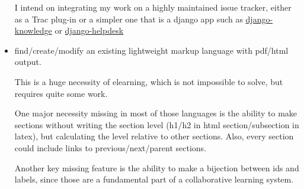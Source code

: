 \documentclass[12pt]{article}
\begin{document}
\begin{itemize}
    I intend on integrating my work on a highly maintained issue tracker,
    either as a Trac plug-in or a simpler one that is a django app such as
    \href{http://www.djangopackages.com/packages/p/django-knowledge/}{django-knowledge}
    or \href{http://www.djangopackages.com/packages/p/django-helpdesk/}{django-helpdesk}  
  
  \item find/create/modify an existing lightweight markup language with pdf/html output.

    This is a huge necessity of elearning, which is not impossible to solve, but requires
    quite some work.
    
    One major necessity missing in most of those languages is the ability to make sections
    without writing the section level (h1/h2 in html section/subsection in latex), but calculating
    the level relative to other sections. Also, every section could include links to previous/next/parent sections.
    
    Another key missing feature is the ability to make a bijection between ids and labels, since those are
    a fundamental part of a collaborative learning system.

\end{itemize}

\newpage

\end{document}
